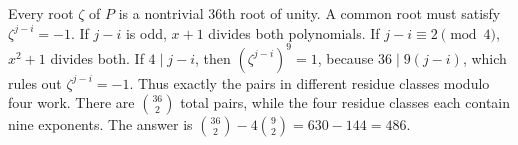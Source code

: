 Every root $\zeta$ of $P$ is a nontrivial $36$th root of unity. A common root must satisfy $\zeta^{j-i}=-1$. If $j-i$ is odd, $x+1$ divides both polynomials. If $j-i\equiv2\pmod4$, $x^2+1$ divides both. If $4\mid j-i$, then $(\zeta^{j-i})^9=1$, because $36\mid9(j-i)$, which rules out $\zeta^{j-i}=-1$. Thus exactly the pairs in different residue classes modulo four work. There are $\binom{36}{2}$ total pairs, while the four residue classes each contain nine exponents. The answer is $\binom{36}{2}-4\binom92=630-144=\boxed{486}$.
